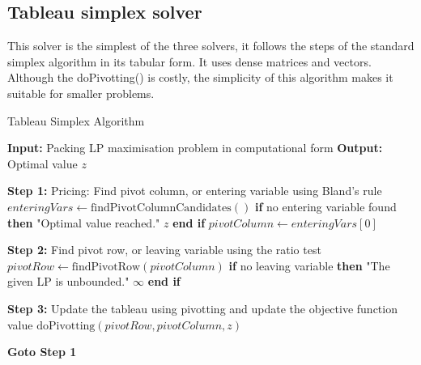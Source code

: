 \subsection{Tableau simplex solver}
This solver is the simplest of the three solvers, it follows the steps of the standard simplex 
algorithm in its tabular form. It uses dense matrices and vectors. Although the
doPivotting() is costly, the simplicity of this algorithm makes it suitable for 
smaller problems.
\begin{algorithm}
    \caption{Tableau Simplex Algorithm}
    \begin{algorithmic}[1]
        \State \textbf{Input:} Packing LP maximisation problem in computational form
        \State \textbf{Output:} Optimal value $z$

        \State \textbf{Step 1:} Pricing: Find pivot column, or entering variable using Bland's rule
        \State \hspace{\algorithmicindent} $enteringVars \gets \text{findPivotColumnCandidates}()$
        \State \hspace{\algorithmicindent} \textbf{if} no entering variable found \textbf{then}
        \State \hspace{\algorithmicindent} \hspace{\algorithmicindent}  "Optimal value reached."
        \State \hspace{\algorithmicindent} \hspace{\algorithmicindent} \Return $z$
        \State \hspace{\algorithmicindent} \textbf{end if}
        \State \hspace{\algorithmicindent} $pivotColumn \gets enteringVars[0]$

        \State \textbf{Step 2:} Find pivot row, or leaving variable using the ratio test
        \State \hspace{\algorithmicindent} $pivotRow \gets \text{findPivotRow}(pivotColumn)$
        \State \hspace{\algorithmicindent} \textbf{if} no leaving variable \textbf{then}
        \State \hspace{\algorithmicindent} \hspace{\algorithmicindent}  "The given LP is unbounded."
        \State \hspace{\algorithmicindent} \hspace{\algorithmicindent} \Return $\infty$
        \State \hspace{\algorithmicindent} \textbf{end if}

        \State \textbf{Step 3:} Update the tableau using pivotting and update the objective function value
        \State \hspace{\algorithmicindent} $\text{doPivotting}(pivotRow, pivotColumn, z)$

        \State \textbf{Goto Step 1}
    \end{algorithmic}
\end{algorithm}
